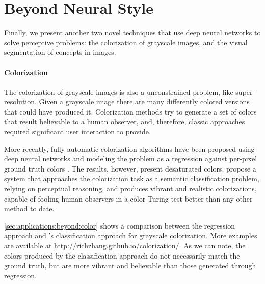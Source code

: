 
\section{Beyond Neural Style}
\label{sec:applications:beyond}

Finally, we present another two novel techniques that use deep neural networks to solve perceptive problems: the colorization of grayscale images, and the visual segmentation of concepts in images.

\paragraph{Colorization}
The colorization of grayscale images is also a unconstrained problem, like super-resolution.
Given a grayscale image there are many differently colored versions that could have produced it.
Colorization methods try to generate a set of colors that result believable to a human observer, and, therefore, classic approaches required significant user interaction to provide.

More recently, fully-automatic colorization algorithms have been proposed using deep neural networks and modeling the problem as a regression against per-pixel ground truth colors \cite{Cheng2015}.
The results, however, present desaturated colors.
\citet{Zhang2016} propose a system that approaches the colorization task as a semantic classification problem, relying on perceptual reasoning, and produces vibrant and realistic colorizations, capable of fooling human observers in a color Turing test better than any other method to date.

\autoref{sec:applications:beyond:color} shows a comparison between the regression approach and \citeauthor{Zhang2016}'s classification approach for grayscale colorization.
More examples are available at \url{http://richzhang.github.io/colorization/}.
As we can note, the colors produced by the classification approach do not necessarily match the ground truth, but are more vibrant and believable than those generated through regression.

